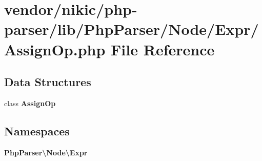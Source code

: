 \section{vendor/nikic/php-\/parser/lib/\+Php\+Parser/\+Node/\+Expr/\+Assign\+Op.php File Reference}
\label{_assign_op_8php}
\subsection*{Data Structures}
\begin{DoxyCompactItemize}
\item 
class {\bf Assign\+Op}
\end{DoxyCompactItemize}
\subsection*{Namespaces}
\begin{DoxyCompactItemize}
\item 
 {\bf Php\+Parser\textbackslash{}\+Node\textbackslash{}\+Expr}
\end{DoxyCompactItemize}
